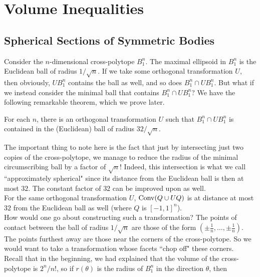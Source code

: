 \section{Volume Inequalities}

\subsection{Spherical Sections of Symmetric Bodies}

Consider the $n$-dimensional cross-polytope $B_1^n$. The maximal ellipsoid in $B_1^n$ is the Euclidean ball of radius $1/\sqrt{n}$. If we take some orthogonal transformation $U$, then obviously, $U B_1^n$ contains the ball as well, and so does $B_1^n \cap U B_1^n$. But what if we instead consider the minimal ball that contains $B_1^n \cap U B_1^n$? We have the following remarkable theorem, which we prove later.

\begin{theorem}[Ka\u{s}in's Theorem]
\label{cross-polytope Kasin's theorem}
For each $n$, there is an orthogonal transformation $U$ such that $B_1^n\cap U B_1^n$ is contained in the (Euclidean) ball of radius $32/\sqrt{n}$.
\end{theorem}

The important thing to note here is the fact that just by intersecting just two copies of the cross-polytope, we manage to reduce the radius of the minimal circumscribing ball by a factor of $\sqrt{n}$! Indeed, this intersection is what we call ``approximately spherical" since its distance from the Euclidean ball is then at most $32$. The constant factor of $32$ can be improved upon as well.\\

For the same orthogonal transformation $U$, $\operatorname{Conv}(Q\cup U Q)$ is at distance at most $32$ from the Euclidean ball as well (where $Q$ is $[-1,1]^n$).\\

How would one go about constructing such a transformation? The points of contact between the ball of radius $1/\sqrt{n}$ are those of the form $\left(\pm\frac{1}{n},\ldots,\pm\frac{1}{n}\right)$.\\
The points furthest away are those near the corners of the cross-polytope. So we would want to take a transformation whose facets ``chop off" these corners.\\

Recall that in the beginning, we had explained that the volume of the cross-polytope is $2^n/n!$, so if $r(\theta)$ is the radius of $B_1^n$ in the direction $\theta$, then


